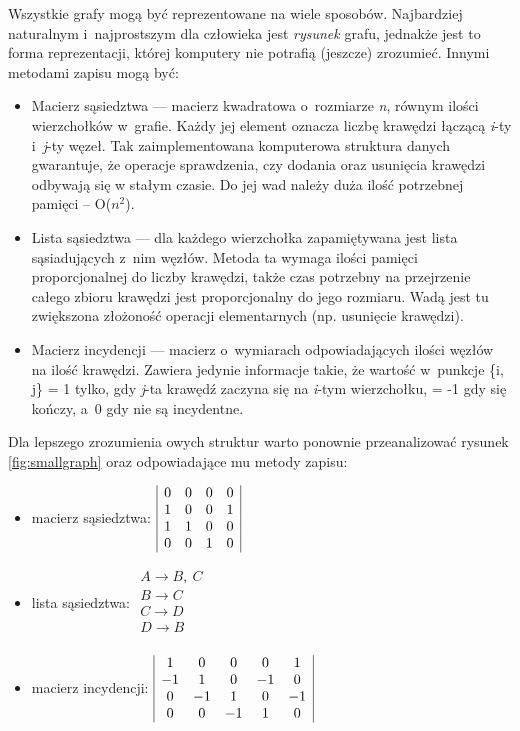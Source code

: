 \documentclass[a4paper,12pt,polish,twoside,openright]{thesis}
\begin{document}
Wszystkie grafy mogą być reprezentowane na wiele sposobów.
Najbardziej naturalnym i~najprostszym dla człowieka jest \emph{rysunek} grafu, jednakże jest to forma reprezentacji, której komputery nie potrafią (jeszcze) zrozumieć.
Innymi metodami zapisu mogą być:
\begin{itemize}
	\item Macierz sąsiedztwa --- macierz kwadratowa o~rozmiarze \emph{n}, równym ilości wierzchołków w~grafie.
	Każdy jej element oznacza liczbę krawędzi łączącą \emph{i}-ty i~\emph{j}-ty węzeł.
	Tak zaimplementowana komputerowa struktura danych gwarantuje, że operacje sprawdzenia, czy dodania oraz usunięcia krawędzi odbywają się w stałym czasie.
	Do jej wad należy duża ilość potrzebnej pamięci – O($n^2$).

	\label{neigh_list}
	\item Lista sąsiedztwa --- dla każdego wierzchołka zapamiętywana jest lista sąsiadujących z~nim węzłów.
	Metoda ta wymaga ilości pamięci proporcjonalnej do liczby krawędzi, także czas potrzebny na przejrzenie całego zbioru krawędzi jest proporcjonalny do jego rozmiaru.
	Wadą jest tu zwiększona złożoność operacji elementarnych (np. usunięcie krawędzi).

	\item Macierz incydencji --- macierz o~wymiarach odpowiadających ilości węzłów na ilość krawędzi.
	Zawiera jedynie informacje takie, że wartość w~punkcje \{i, j\} = 1 tylko, gdy \emph{j}-ta krawędź zaczyna się na \emph{i}-tym wierzchołku, = -1 gdy się kończy, a~0 gdy nie są incydentne.
\end{itemize}

Dla lepszego zrozumienia owych struktur warto ponownie przeanalizować rysunek \ref{fig:smallgraph}
oraz odpowiadające mu metody zapisu:
\begin{itemize}
	\item macierz sąsiedztwa:
		$\begin{array}{|c c c c|}
			0 & 0 & 0 & 0 \\
			1 & 0 & 0 & 1 \\
			1 & 1 & 0 & 0 \\
			0 & 0 & 1 & 0 \\
		\end{array}$
	\item lista sąsiedztwa:
		$\begin{array}{l}
			A \rightarrow B,~C \\
			B \rightarrow C \\
			C \rightarrow D \\
			D \rightarrow B \\
		\end{array}$
	\item macierz incydencji:
		$\begin{array}{|c c c c c|}
			1  & 0  & 0  & 0  & 1  \\
			-1 & 1  & 0  & -1 & 0  \\
			0  & -1 & 1  & 0  & -1 \\
			0  & 0  & -1 & 1  & 0  \\
		\end{array}$
\end{itemize}
\end{document}
